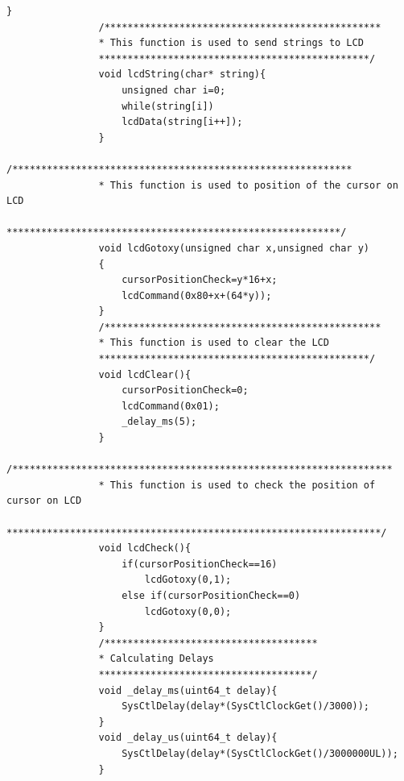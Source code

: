 \documentclass[a4paper,10pt,oneside]{article}
\begin{document}
\begin{lstlisting}[style=CStyle]
				}
				/************************************************
				* This function is used to send strings to LCD
				***********************************************/
				void lcdString(char* string){
					unsigned char i=0;
					while(string[i])
					lcdData(string[i++]);
				}
				/***********************************************************
				* This function is used to position of the cursor on LCD
				**********************************************************/
				void lcdGotoxy(unsigned char x,unsigned char y)
				{
					cursorPositionCheck=y*16+x;
					lcdCommand(0x80+x+(64*y));
				}
				/************************************************
				* This function is used to clear the LCD
				***********************************************/
				void lcdClear(){
					cursorPositionCheck=0;
					lcdCommand(0x01);
					_delay_ms(5);
				}
				/******************************************************************
				* This function is used to check the position of cursor on LCD
				*****************************************************************/
				void lcdCheck(){
					if(cursorPositionCheck==16)
						lcdGotoxy(0,1);
					else if(cursorPositionCheck==0)
						lcdGotoxy(0,0);
				}
				/*************************************
				* Calculating Delays
				*************************************/
				void _delay_ms(uint64_t delay){
					SysCtlDelay(delay*(SysCtlClockGet()/3000));
				}
				void _delay_us(uint64_t delay){
					SysCtlDelay(delay*(SysCtlClockGet()/3000000UL));
				}
			\end{lstlisting}
			
\end{document}
